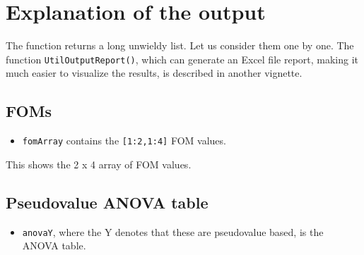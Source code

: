 \documentclass[]{book}
\newenvironment{Shaded}{\begin{snugshade}}{\end{snugshade}}
\newcommand{\CommentTok}[1]{\textcolor[rgb]{0.56,0.35,0.01}{\textit{#1}}}
\newcommand{\NormalTok}[1]{#1}
\newcommand{\OperatorTok}[1]{\textcolor[rgb]{0.81,0.36,0.00}{\textbf{#1}}}
\providecommand{\tightlist}{%
  \setlength{\itemsep}{0pt}\setlength{\parskip}{0pt}}
\begin{document}
\hypertarget{explanation-of-the-output}{%
\section{Explanation of the output}\label{explanation-of-the-output}}

The function returns a long unwieldy list. Let us consider them one by one. The function \texttt{UtilOutputReport()}, which can generate an Excel file report, making it much easier to visualize the results, is described in another vignette.

\hypertarget{foms}{%
\subsection{FOMs}\label{foms}}

\begin{itemize}
\tightlist
\item
  \texttt{fomArray} contains the \texttt{{[}1:2,1:4{]}} FOM values.
\end{itemize}

\begin{Shaded}
\end{Shaded}

This shows the 2 x 4 array of FOM values.

\hypertarget{pseudovalue-anova-table}{%
\subsection{Pseudovalue ANOVA table}\label{pseudovalue-anova-table}}

\begin{itemize}
\tightlist
\item
  \texttt{anovaY}, where the Y denotes that these are pseudovalue based, is the ANOVA table.
\end{itemize}

\begin{Shaded}
\end{Shaded}
\end{document}
